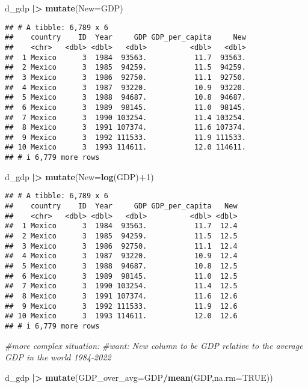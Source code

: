\documentclass[
]{article}
\newenvironment{Shaded}{\begin{snugshade}}{\end{snugshade}}
\newcommand{\AttributeTok}[1]{\textcolor[rgb]{0.13,0.29,0.53}{#1}}
\newcommand{\CommentTok}[1]{\textcolor[rgb]{0.56,0.35,0.01}{\textit{#1}}}
\newcommand{\ConstantTok}[1]{\textcolor[rgb]{0.56,0.35,0.01}{#1}}
\newcommand{\DecValTok}[1]{\textcolor[rgb]{0.00,0.00,0.81}{#1}}
\newcommand{\FunctionTok}[1]{\textcolor[rgb]{0.13,0.29,0.53}{\textbf{#1}}}
\newcommand{\NormalTok}[1]{#1}
\newcommand{\SpecialCharTok}[1]{\textcolor[rgb]{0.81,0.36,0.00}{\textbf{#1}}}
\begin{document}
\begin{Shaded}
\begin{Highlighting}[]
\NormalTok{d\_gdp }\SpecialCharTok{|\textgreater{}} \FunctionTok{mutate}\NormalTok{(}\AttributeTok{New=}\NormalTok{GDP)}
\end{Highlighting}
\end{Shaded}

\begin{verbatim}
## # A tibble: 6,789 x 6
##    country    ID  Year     GDP GDP_per_capita     New
##    <chr>   <dbl> <dbl>   <dbl>          <dbl>   <dbl>
##  1 Mexico      3  1984  93563.           11.7  93563.
##  2 Mexico      3  1985  94259.           11.5  94259.
##  3 Mexico      3  1986  92750.           11.1  92750.
##  4 Mexico      3  1987  93220.           10.9  93220.
##  5 Mexico      3  1988  94687.           10.8  94687.
##  6 Mexico      3  1989  98145.           11.0  98145.
##  7 Mexico      3  1990 103254.           11.4 103254.
##  8 Mexico      3  1991 107374.           11.6 107374.
##  9 Mexico      3  1992 111533.           11.9 111533.
## 10 Mexico      3  1993 114611.           12.0 114611.
## # i 6,779 more rows
\end{verbatim}

\begin{Shaded}
\begin{Highlighting}[]
\NormalTok{d\_gdp }\SpecialCharTok{|\textgreater{}} \FunctionTok{mutate}\NormalTok{(}\AttributeTok{New=}\FunctionTok{log}\NormalTok{(GDP)}\SpecialCharTok{+}\DecValTok{1}\NormalTok{)}
\end{Highlighting}
\end{Shaded}

\begin{verbatim}
## # A tibble: 6,789 x 6
##    country    ID  Year     GDP GDP_per_capita   New
##    <chr>   <dbl> <dbl>   <dbl>          <dbl> <dbl>
##  1 Mexico      3  1984  93563.           11.7  12.4
##  2 Mexico      3  1985  94259.           11.5  12.5
##  3 Mexico      3  1986  92750.           11.1  12.4
##  4 Mexico      3  1987  93220.           10.9  12.4
##  5 Mexico      3  1988  94687.           10.8  12.5
##  6 Mexico      3  1989  98145.           11.0  12.5
##  7 Mexico      3  1990 103254.           11.4  12.5
##  8 Mexico      3  1991 107374.           11.6  12.6
##  9 Mexico      3  1992 111533.           11.9  12.6
## 10 Mexico      3  1993 114611.           12.0  12.6
## # i 6,779 more rows
\end{verbatim}

\begin{Shaded}
\begin{Highlighting}[]
\CommentTok{\#more complex situation:}
\CommentTok{\#want: New column to be GDP relative to the average GDP in the world 1984{-}2022}

\NormalTok{d\_gdp }\SpecialCharTok{|\textgreater{}} \FunctionTok{mutate}\NormalTok{(}\AttributeTok{GDP\_over\_avg=}\NormalTok{GDP}\SpecialCharTok{/}\FunctionTok{mean}\NormalTok{(GDP,}\AttributeTok{na.rm=}\ConstantTok{TRUE}\NormalTok{))}
\end{Highlighting}
\end{Shaded}
\end{document}
